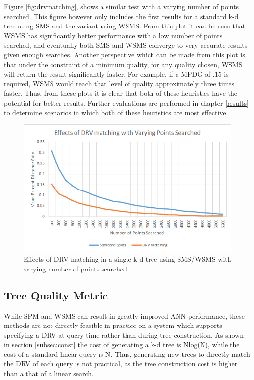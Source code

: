 Figure \ref{fig:drvmatching}, shows a similar test with a varying number of points searched.  This figure however only includes the first results for a standard k-d tree using SMS and the variant using WSMS.  From this plot it can be seen that WSMS has significantly better performance with a low number of points searched, and eventually both SMS and WSMS converge to very accurate results given enough searches.  Another perspective which can be made from this plot is that under the constraint of a minimum quality, for any quality chosen, WSMS will return the result significantly faster.  For example, if a MPDG of .15 is required, WSMS would reach that level of quality approximately three times faster.  Thus, from these plots it is clear that both of these heuristics have the potential for better results.  Further evaluations are performed in chapter \ref{results} to determine scenarios in which both of these heuristics are most effective.

\begin{figure}[h]
\begin{center}
\includegraphics[width=\textwidth]{Figures/sysdesc_drv_varying_points}
\end{center}
\caption{Effects of DRV matching in a single k-d tree using SMS/WSMS with varying number of points searched}
\label{fig:drv_varying_points}
\end{figure}

\subsection{Tree Quality Metric}

While SPM and WSMS can result in greatly improved ANN performance, these methods are not directly feasible in practice on a system which supports specifying a DRV at query time rather than during tree construction.  As shown in section \ref{subsec:const} the cost of generating a k-d tree is Nlog(N), while the cost of a standard linear query is N.  Thus, generating new trees to directly match the DRV of each query is not practical, as the tree construction cost is higher than a that of a linear search.


